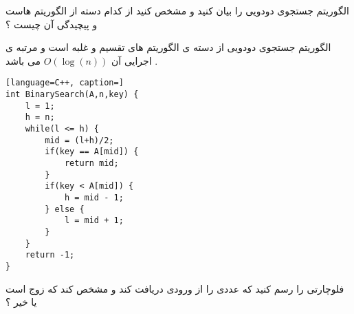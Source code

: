 \documentclass[12pt]{article}
\begin{document}
\newpage

\noindent
الگوریتم جستجوی دودویی را بیان کنید و مشخص کنید از کدام دسته از الگوریتم هاست و پیچیدگی آن چیست ؟

\vspace{30pt}

\begin{tcolorbox}
\noindent
الگوریتم جستجوی دودویی از دسته ی الگوریتم های تقسیم و غلبه است و مرتبه ی اجرایی آن
$O(\log{(n)})$
می باشد .
\end{tcolorbox}


\begin{latin}
\begin{lstlisting}[language=C++, caption=]
int BinarySearch(A,n,key) {
	l = 1;
	h = n;
	while(l <= h) {
		mid = (l+h)/2;
		if(key == A[mid]) {
			return mid;
		}
		if(key < A[mid]) {
			h = mid - 1;
		} else {
			l = mid + 1;
		}
	}
	return -1;
}
\end{lstlisting}
\end{latin}


\vspace{30pt}



\newpage

\noindent
فلوچارتی را رسم کنید که عددی را از ورودی دریافت کند و مشخص کند که زوج است یا خیر ؟


\vspace{30pt}



\begin{center}
\end{center}



\vspace{30pt}
\end{document}
